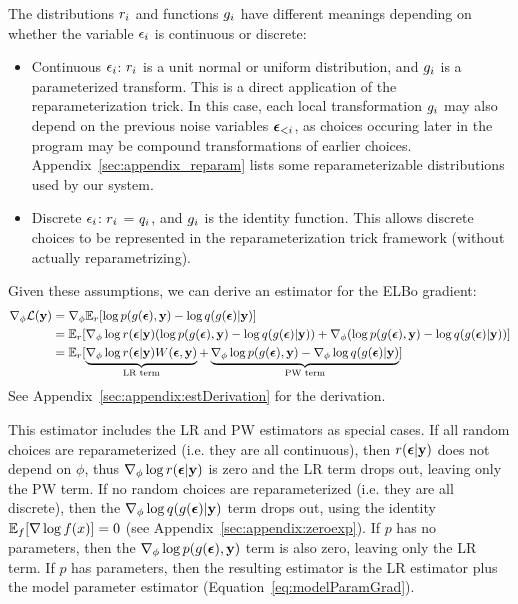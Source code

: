 The distributions $r_i$ and functions $g_i$ have different meanings depending on whether the variable $\epsilon_i$ is continuous or discrete:
\begin{itemize}
\item{Continuous $\epsilon_i$: $r_i$ is a unit normal or uniform distribution, and $g_i$ is a parameterized transform. This is a direct application of the reparameterization trick. In this case, each local transformation $g_i$ may also depend on the previous noise variables $\bm{\epsilon}_{<i}$, as choices occuring later in the program may be compound transformations of earlier choices. Appendix~\ref{sec:appendix_reparam} lists some reparameterizable distributions used by our system.}
\item{Discrete $\epsilon_i$: $r_i$ = $q_i$, and $g_i$ is the identity function. This allows discrete choices to be represented in the reparameterization trick framework (without actually reparametrizing).}
\end{itemize}
Given these assumptions, we can derive an estimator for the ELBo gradient:
\begin{align}
\label{eq:hybridEstimator}
\gradparams \elbo
%
&= \gradparams \expect_\reparamDist [ \log p(\xformedVars, \observedVars) - \log \guide(\xformedVars | \observedVars) ]\\
%
&= \expect_\reparamDist [ \gradparams \log \reparamDist(\reparamVars | \observedVars) ( \log p(\xformedVars, \observedVars) - \log \guide(\xformedVars | \observedVars) ) + \gradparams( \log p(\xformedVars, \observedVars) - \log \guide(\xformedVars | \observedVars) )]\nonumber\\
%
&= \expect_\reparamDist [ \underbrace{\gradparams \log \reparamDist(\reparamVars | \observedVars) W(\reparamVars, \observedVars)}_{\text{LR term}} + \underbrace{\gradparams \log p(\xformedVars, \observedVars) - \gradparams \log \guide(\xformedVars | \observedVars)}_{\text{PW term}} ]\nonumber
\end{align}
See Appendix~\ref{sec:appendix:estDerivation} for the derivation. 

This estimator includes the LR and PW estimators as special cases. If all random choices are reparameterized (i.e. they are all continuous), then $r(\bm{\epsilon} | \mathbf{y})$ does not depend on $\phi$, thus $\nabla_\phi \log r(\bm{\epsilon} | \mathbf{y})$ is zero and the LR term drops out, leaving only the PW term. If no random choices are reparameterized (i.e. they are all discrete), then the $\nabla_\phi \log q(g(\bm{\epsilon}) | \mathbf{y})$ term drops out, using the identity $\mathbb{E}_f[\nabla \log f(x)] = 0$ (see Appendix~\ref{sec:appendix:zeroexp}). If $p$ has no parameters, then the $\nabla_\phi \log p(g(\bm{\epsilon}), \mathbf{y})$ term is also zero, leaving only the LR term. If $p$ has parameters, then the resulting estimator is the LR estimator plus the model parameter estimator (Equation~\ref{eq:modelParamGrad}).

